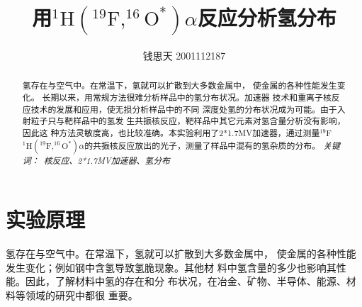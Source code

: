 \documentclass{article}
\title{用$^{1}\text{H}( ^{19}\text{F}, ^{16}\text{O}^* )\alpha$反应分析氢分布}
\author{钱思天 2001112187}
\begin{document}
    \maketitle
    \begin{abstract}
        氢存在与空气中。在常温下，氢就可以扩散到大多数金属中，
使金属的各种性能发生变化。
长期以来，用常规方法很难分析样品中的氢分布状况。加速器
技术和重离子核反应技术的发展和应用，使无损分析样品中的不同
深度处氢的分布状况成为可能。由于入射粒子只与靶样品中的氢发
生共振核反应，靶样品中其它元素对氢含量分析没有影响，因此这
种方法灵敏度高，也比较准确。本实验利用了2*1.7MV加速器，通过测量$^{19}\text{F}$$^{1}\text{H}( ^{19}\text{F}, ^{16}\text{O}^* )\alpha$的共振核反应放出的光子，测量了样品中混有的氢杂质的分布。
        \newline
        \newline
        {\emph{ 关键词：\ 核反应、2*1.7MV加速器、氢分布 }\rm}

    \end{abstract}

\section{实验原理}
氢存在与空气中。在常温下，氢就可以扩散到大多数金属中，
使金属的各种性能发生变化；例如钢中含氢导致氢脆现象。其他材
料中氢含量的多少也影响其性能。因此，了解材料中氢的存在和分
布状况，在冶金、矿物、半导体、能源、材料等领域的研究中都很
重要。
\end{document}
